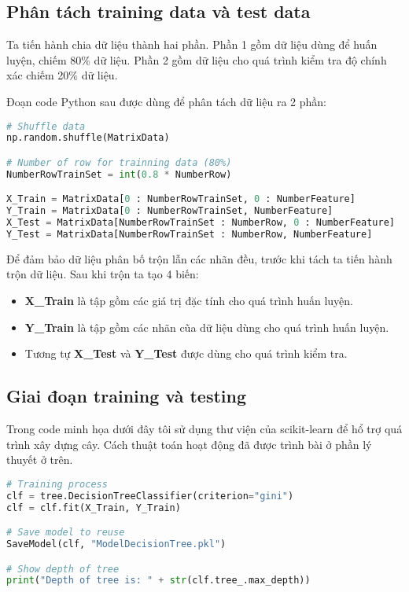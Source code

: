 \documentclass[../main-report.tex]{subfiles}
\begin{document}
\subsection{Phân tách training data và test data}
Ta tiến hành chia dữ liệu thành hai phần. Phần 1 gồm dữ liệu dùng để huấn luyện, chiếm 80\% dữ liệu. Phần 2 gồm dữ liệu cho quá trình kiểm tra độ chính xác chiếm 20\% dữ liệu.

Đoạn code Python sau được dùng để phân tách dữ liệu ra 2 phần:

\begin{lstlisting}[language=Python]
# Shuffle data
np.random.shuffle(MatrixData)

# Number of row for trainning data (80%)
NumberRowTrainSet = int(0.8 * NumberRow)

X_Train = MatrixData[0 : NumberRowTrainSet, 0 : NumberFeature]
Y_Train = MatrixData[0 : NumberRowTrainSet, NumberFeature]
X_Test = MatrixData[NumberRowTrainSet : NumberRow, 0 : NumberFeature]
Y_Test = MatrixData[NumberRowTrainSet : NumberRow, NumberFeature]
\end{lstlisting}

Để đảm bảo dữ liệu phân bố trộn lẫn các nhãn đều, trước khi tách ta tiến hành trộn dữ liệu. Sau khi trộn ta tạo 4 biến:

\begin{itemize}
\item \textbf{X\_Train} là tập gồm các giá trị đặc tính cho quá trình huấn luyện.
\item \textbf{Y\_Train} là tập gồm các nhãn cũa dữ liệu dùng cho quá trình huấn luyện.
\item Tương tự \textbf{X\_Test} và \textbf{Y\_Test} được dùng cho quá trình kiểm tra.
\end{itemize}

\subsection{Giai đoạn training và testing}
Trong code minh họa dưới đây tôi sử dụng thư viện của scikit-learn để hổ trợ quá trình xây dựng cây. Cách thuật toán hoạt động đã được trình bài ở phần lý thuyết ở trên.

\begin{lstlisting}[language=Python]
# Training process
clf = tree.DecisionTreeClassifier(criterion="gini")
clf = clf.fit(X_Train, Y_Train)

# Save model to reuse
SaveModel(clf, "ModelDecisionTree.pkl")

# Show depth of tree
print("Depth of tree is: " + str(clf.tree_.max_depth))
\end{lstlisting}
\end{document}
